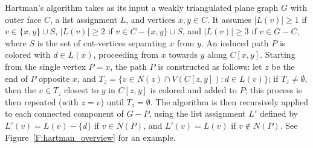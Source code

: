 \documentclass[12pt,letterpaper]{article}
\theoremstyle{plain}
\theoremstyle{definition}
\theoremstyle{break}
\begin{document}
Hartman's algorithm takes as its input a
weakly triangulated plane
graph $G$ with outer face $C$, a list assignment $L$, and
vertices $x,y\in C$. It
assumes $|L(v)|\ge 1$ if $v\in\{x,y\}\cup S$, $|L(v)|\ge 2$ if
$v\in C-\{x,y\}\cup S$, and $|L(v)|\ge 3$ if $v\in G-C$,
where $S$ is the set of cut-vertices separating $x$ from $y$. An
induced path $P$ is colored with $d\in L(x)$,
proceeding from $x$ towards $y$ along $C[x,y]$. Starting from
the single vertex $P=x$, the path $P$ is constructed
as follows: let $z$ be the end of $P$ opposite $x$, and
$T_{z}=\{v\in N(z)\cap V(C[z,y]):d\in L(v)\}$; if $T_{z}\ne\emptyset$,
then the $v\in T_{z}$ closest to $y$ in $C[z,y]$
is colored and added to $P$; this process is then repeated (with $z=v$) until
$T_z=\emptyset$.
The algorithm is then recursively applied to each connected
component of $G-P$, using the list assignment $L'$ defined by
$L'(v)=L(v)-\{d\}$ if $v\in N(P)$, and $L'(v)=L(v)$ if
$v\not\in N(P)$. See Figure~\ref{F:hartman_overview}
for an example.
\end{document}
